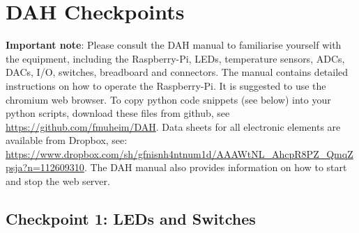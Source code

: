 \chapter{DAH Checkpoints}
\label{sec:checkpoints}
\vspace*{-0.99cm}
{\bf Important note}: Please consult the DAH manual to familiarise yourself with the equipment, including the Raspberry-Pi, LEDs, temperature sensors, ADCs, DACs, I/O, switches, breadboard and connectors.
The manual contains detailed instructions on how to operate the Raspberry-Pi.
It is suggested to use the chromium web browser. %
To copy python code snippets (see below) into your python scripts, download these files from github, see \url{https://github.com/fmuheim/DAH}.
Data sheets for all electronic elements are available from Dropbox, see: \url{https://www.dropbox.com/sh/gfnisnh4ntnum1d/AAAWtNL_AhcpR8PZ_QmqZpsja?n=112609310}.  
The DAH manual also provides information on how to start and stop the \webIOPi web server.

\section{Checkpoint  1: LEDs and Switches}

